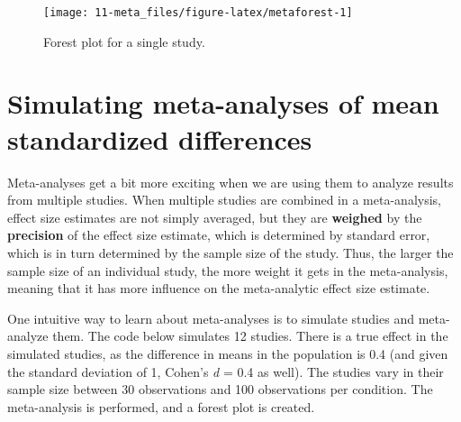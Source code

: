 \documentclass[
  oneside]{krantz}
\begin{document}
\begin{figure}

{\centering \texttt{[image: 11-meta\_files/figure-latex/metaforest-1]} 

}

\caption{Forest plot for a single study.}\label{fig:metaforest}
\end{figure}

\hypertarget{simulating-meta-analyses-of-mean-standardized-differences}{%
\section{Simulating meta-analyses of mean standardized differences}\label{simulating-meta-analyses-of-mean-standardized-differences}}

Meta-analyses get a bit more exciting when we are using them to analyze results from multiple studies. When multiple studies are combined in a meta-analysis, effect size estimates are not simply averaged, but they are \textbf{weighed} by the \textbf{precision} of the effect size estimate, which is determined by standard error, which is in turn determined by the sample size of the study. Thus, the larger the sample size of an individual study, the more weight it gets in the meta-analysis, meaning that it has more influence on the meta-analytic effect size estimate.

One intuitive way to learn about meta-analyses is to simulate studies and meta-analyze them. The code below simulates 12 studies. There is a true effect in the simulated studies, as the difference in means in the population is 0.4 (and given the standard deviation of 1, Cohen's \emph{d} = 0.4 as well). The studies vary in their sample size between 30 observations and 100 observations per condition. The meta-analysis is performed, and a forest plot is created.
\end{document}
